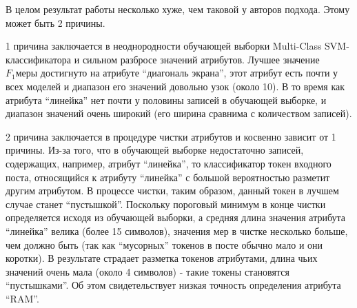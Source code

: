 В целом результат работы несколько хуже, чем таковой у авторов подхода. Этому может быть 2 причины.

1 причина заключается в неоднородности обучающей выборки Multi-Class SVM-классификатора и сильном разбросе значений атрибутов. Лучшее значение $F_1 \text{меры}$ достигнуто на атрибуте ``диагональ экрана'', этот атрибут есть почти у всех моделей и диапазон его значений довольно узок (около 10). В то время как атрибута ``линейка'' нет почти у половины записей в обучающей выборке, и диапазон значений очень широкий (его ширина сравнима с количеством записей).

2 причина заключается в процедуре чистки атрибутов и косвенно зависит от 1 причины. Из-за того, что в обучающей выборке недостаточно записей, содержащих, например, атрибут ``линейка'', то классификатор токен входного поста, относящийся к атрибуту ``линейка'' с большой вероятностью разметит другим атрибутом. В процессе чистки, таким образом, данный токен в лучшем случае станет ``пустышкой''. Поскольку пороговый минимум в конце чистки определяется исходя из обучающей выборки, а средняя длина значения атрибута ``линейка'' велика (более 15 символов), значения мер в чистке несколько больше, чем должно быть (так как ``мусорных'' токенов в посте обычно мало и они коротки). В результате страдает разметка токенов атрибутами, длина чьих значений очень мала (около 4 символов) - такие токены становятся ``пустышками''. Об этом свидетельствует низкая точность определения атрибута ``RAM''. 